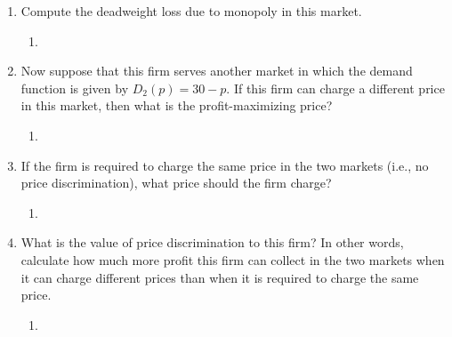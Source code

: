 \documentclass[11pt]{article}
\begin{document}
\begin{enumerate}
\begin{enumerate}
	\item Compute the deadweight loss due to monopoly in this market.
	\begin{enumerate}
        \item 
    \end{enumerate}
	

	\item Now suppose that this firm serves another market in which the demand function is given by $D_{2}(p)=30-p$. If this firm can charge a different price in this market, then what is the profit-maximizing price?
	\begin{enumerate}
        \item 
    \end{enumerate}
	

	\item If the firm is required to charge the same price in the two markets (i.e., no price discrimination), what price should the firm charge?
	\begin{enumerate}
        \item 
    \end{enumerate}
	
	
	\item What is the value of price discrimination to this firm? In other words, calculate how much more profit this firm can collect in the two markets when it can charge different prices than when it is required to charge the same price.
	\begin{enumerate}
        \item 
    \end{enumerate}
	
	
    \end{enumerate}
\end{enumerate}
\end{document}
